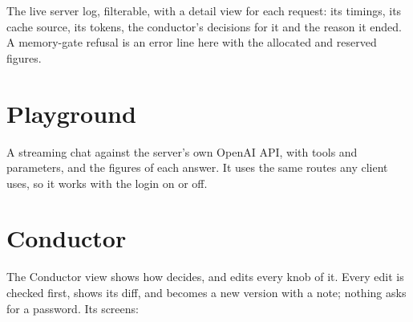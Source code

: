 The live server log, filterable, with a detail view for each request: its timings, its cache source, its tokens, the conductor's decisions for it and the reason it ended. A memory-gate refusal is an error line here with the allocated and reserved figures.


\section{Playground}

A streaming chat against the server's own OpenAI API, with tools and parameters, and the figures of each answer. It uses the same routes any client uses, so it works with the login on or off.


\section{Conductor}

The Conductor view shows how  decides, and edits every knob of it. Every edit is checked first, shows its diff, and becomes a new version with a note; nothing asks for a password. Its screens:

